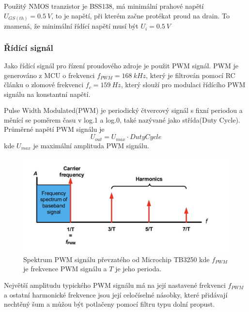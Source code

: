 Použitý NMOS tranzistor je BSS138, má minimální prahové napětí $U_{GS(th)} = 0.5 \ V$, to je napětí, při kterém začne protékat proud na drain. To znamená, že minimální řídící napětí musí být $U_{i} = 0.5 \ V$


\subsubsection{Řídící signál}
Jako řídící signál pro řízení proudového zdroje je použit PWM signál. PWM je generováno z MCU o frekvenci $f_{PWM} = 168 \ kHz$, který je filtrován pomocí RC článku o zlomové frekvenci $f_c = 159 \ Hz$, který slouží pro modulaci řídícího PWM signálu na konstantní napětí.
\par
Pulse Width Modulated(PWM) je periodický čtvercový signál s fixní periodou a měnící se poměrem času v log.1 a log.0, také nazývané jako střída(Duty Cycle). Průměrné napětí PWM signálu je
\begin{equation}
    U_{out} = U_{max} \cdot Duty Cycle
\end{equation}
kde $U_{max}$ je maximální amplituda PWM signálu. \par

\begin{figure}[H]
    \centering
    \includegraphics[width=1\linewidth]{pictures/pwm_spectrum_microchip90003250A.jpg}
    \caption{Spektrum PWM signálu převzatého od Microchip TB3250 kde $f_{PWM}$ je frekvence PWM signálu a $T$ je jeho perioda. \cite{cite:MCPPWV}}
    \label{fig:pwm_spectrum}
\end{figure}

Největší amplitudu typického PWM signálu má na její nastavené frekvenci $f_{PWM}$ a ostatní harmonické frekvence jsou její celočíselné násobky, které přidávají nechtěný šum a můžou být potlačeny pomocí filtru typu dolní propust.


